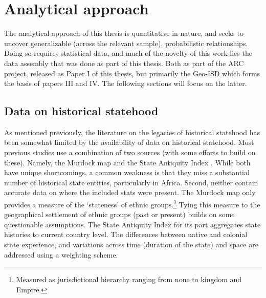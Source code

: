 \section{Analytical approach} \label{Analytical approach}


The analytical approach of this thesis is quantitative in nature, and seeks to
uncover generalizable (across the relevant sample), probabilistic relationships.
Doing so requires statistical data, and much of the novelty of this work lies
the data assembly that was done as part of this thesis. Both as part of the ARC
project, released as Paper I of this thesis, but primarily the Geo-ISD which
forms the basis of papers III and IV. The following sections will focus on the
latter.

\subsection{Data on historical statehood} \label{Data on historical statehood}






As mentioned previously, the literature on the legacies of historical statehood
has been somewhat limited by the availability of data on historical statehood.
Most previous studies use a combination of two sources (with some efforts to
build on these). Namely, the Murdock map \citep{Murdock1967} and the State
Antiquity Index \citep{Bockstette2012}. While both have unique shortcomings, a
common weakness is that they miss a substantial number of historical state
entities, particularly in Africa. Second, neither contain accurate data on where
the included stats were present. The Murdock map \citep{Murdock1967} only
provides a measure of the `stateness' of ethnic groups.\footnote{Measured as
jurisdictional hierarchy ranging from none to kingdom and Empire.} Tying this
measure to the geographical settlement of ethnic groups (past or present) builds
on some questionable assumptions. The State Antiquity Index for its part
aggregates state histories to current country level. The differences between
native and colonial state experience, and variations across time (duration of
the state) and space are addressed using a weighting scheme.


